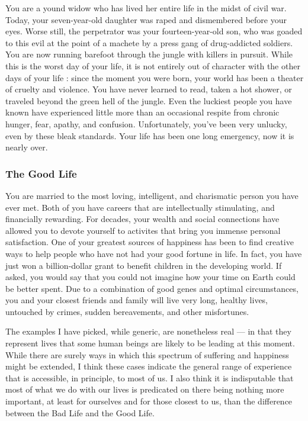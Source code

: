 \documentclass[a4paper,12pt]{extbook}
\begin{document}
You are a yound widow who has lived her entire life in the midst of civil war.
Today, your seven-year-old daughter was raped and dismembered before your eyes.
Worse still, the perpetrator was your fourteen-year-old son, who was goaded to this evil at the point of a machete by a press gang of drug-addicted soldiers.
You are now running barefoot through the jungle with killers in pursuit.
While this is the worst day of your life, it is not entirely out of character with the other days of your life :
since the moment you were born, your world has been a theater of cruelty and violence.
You have never learned to read, taken a hot shower, or traveled beyond the green hell of the jungle.
Even the luckiest people you have known have experienced little more than an occasional respite from chronic hunger, fear, apathy, and confusion.
Unfortunately, you've been very unlucky, even by these bleak standards.
Your life has been one long emergency, now it is nearly over.

\subsubsection{The Good Life}

You are married to the most loving, intelligent, and charismatic person you have ever met.
Both of you have careers that are intellectually stimulating, and financially rewarding.
For decades, your wealth and social connections have allowed you to devote yourself to activites that bring you immense personal satisfaction.
One of your greatest sources of happiness has been to find creative ways to help people who have not had your good fortune in life.
In fact, you have just won a billion-dollar grant to benefit children in the developing world.
If asked, you would say that you could not imagine how your time on Earth could be better spent.
Due to a combination of good genes and optimal circumstances, you and your closest friends and family will live very long, healthy lives, untouched by crimes, sudden bereavements, and other misfortunes.

The examples I have picked, while generic, are nonetheless real --- in that they represent lives that some human beings are likely to be leading at this moment. 
While there are surely ways in which this spectrum of suffering and happiness might be extended, I think these cases indicate the general range of experience that is accessible, in principle, to most of us. 
I also think it is indisputable that most of what we do with our lives is predicated on there being nothing more important, at least for ourselves and for those closest to us, than the difference between the Bad Life and the Good Life.
\end{document}
